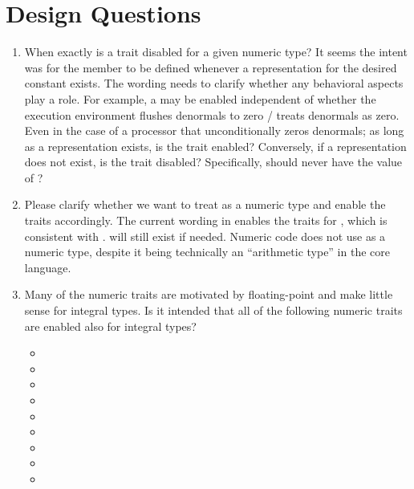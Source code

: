 \section{Design Questions}
\begin{enumerate}
  \item When exactly is a trait disabled for a given numeric type?
  It seems the intent was for the  member to be defined whenever a representation for the desired constant exists.
  The wording needs to clarify whether any behavioral aspects play a role.
  For example, a  may be enabled independent of whether the execution environment flushes denormals to zero / treats denormals as zero.
  Even in the case of a processor that unconditionally zeros denormals; as long as a representation exists, is the trait enabled?
  Conversely, if a representation does not exist, is the trait disabled?
  Specifically,  should never have the value of ?

  \item Please clarify whether we want to treat  as a numeric type and enable the traits accordingly.
  The current wording in \cite{P1841R2} enables the traits for , which is consistent with .
   will still exist if needed.
  Numeric code does not use  as a numeric type, despite it being technically an “arithmetic type” in the core language.

  \item Many of the numeric traits are motivated by floating-point and make little sense for integral types.
  Is it intended that all of the following numeric traits are enabled also for integral types?
  \begin{itemize}
    \item {}
    \item {}
    \item {}
    \item {}
    \item {}
    \item {}
    \item {}
    \item {}
    \item {}
  \end{itemize}


\end{enumerate}
